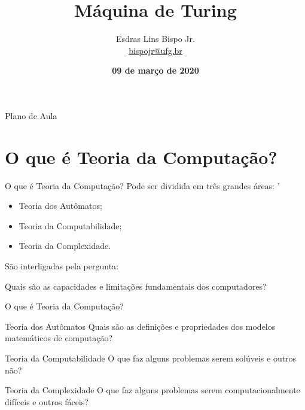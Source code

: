 \documentclass[xcolor=dvipsnames,table]{beamer}
\title{Máquina de Turing}
\author{
  Esdras Lins Bispo Jr. \\ \url{bispojr@ufg.br}
  }
\institute{
  Teoria da Computação \\Bacharelado em Ciência da Computação}
\date{\textbf{09 de março de 2020} }
\begin{document}
	\begin{frame}
		\titlepage
	\end{frame}

	\AtBeginSection{
		\begin{frame}{Sumário}%
    		\tableofcontents[currentsection]
		\end{frame}
	}

	\begin{frame}{Plano de Aula}
		\tableofcontents
	\end{frame}

	\section{O que é Teoria da Computação?}
	\begin{frame}{O que é Teoria da Computação?}
		Pode ser dividida em três grandes áreas: \pause'
		\begin{itemize}
			\item Teoria dos Autômatos;
			\item Teoria da Computabilidade;
			\item Teoria da Complexidade.	
		\end{itemize} \pause
		São interligadas pela pergunta: \pause
		\begin{block}{}
			Quais são as capacidades e limitações fundamentais dos computadores?
		\end{block}
	\end{frame}
	
	\begin{frame}{O que é Teoria da Computação?}
		\begin{block}{Teoria dos Autômatos}
			Quais são as definições e propriedades dos modelos matemáticos de computação?
		\end{block} \pause
		\begin{block}{Teoria da Computabilidade}
			O que faz alguns problemas serem solúveis e outros não?		
		\end{block} \pause
		\begin{block}{Teoria da Complexidade}
			O que faz alguns problemas serem computacionalmente difíceis e outros fáceis?
		\end{block}
	\end{frame}
	
\end{document}
